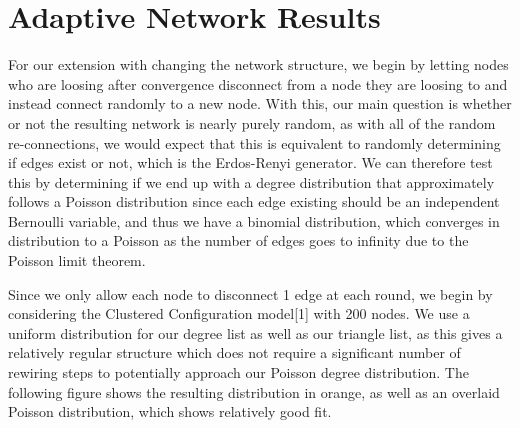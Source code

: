 \documentclass[letterpaper, 12 pt, conference]{ieeeconf}
\begin{document}
\section*{Adaptive Network Results}
For our extension with changing the network structure, we begin by letting nodes who are loosing after convergence disconnect from a node they are loosing to and instead connect randomly to a new node. With this, our main question is whether or not the resulting network is nearly purely random, as with all of the random re-connections, we would expect that this is equivalent to randomly determining if edges exist or not, which is the Erdos-Renyi generator. We can therefore test this by determining if we end up with a degree distribution that approximately follows a Poisson distribution since each edge existing should be an independent Bernoulli variable, and thus we have a binomial distribution, which converges in distribution to a Poisson as the number of edges goes to infinity due to the Poisson limit theorem.
\par
Since we only allow each node to disconnect 1 edge at each round, we begin by considering the Clustered Configuration model[1] with 200 nodes. We use a uniform distribution for our degree list as well as our triangle list, as this gives a relatively regular structure which does not require a significant number of rewiring steps to potentially approach our Poisson degree distribution. The following figure shows the resulting distribution in orange, as well as an overlaid Poisson distribution, which shows relatively good fit. 
\end{document}
